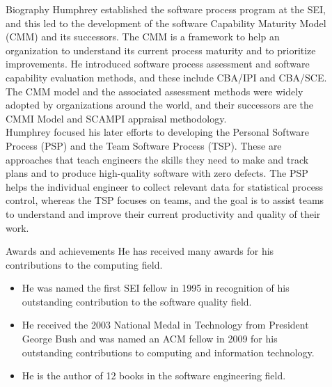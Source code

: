 \documentclass[final]{beamer}
\newlength{\sepwidth}
\newlength{\colwidth}
\newcommand{\separatorcolumn}{\begin{column}{\sepwidth}\end{column}}
\begin{document}
\begin{frame}[t]
\begin{columns}[t]
\begin{column}{\colwidth}
\begin{block}{Biography}
  	Humphrey established the software process program at the SEI, and this led to the development of the software Capability Maturity Model (CMM) and its successors. The CMM is a framework to help an organization to understand its current process maturity and to prioritize improvements. He introduced software process assessment and software capability evaluation methods, and these include CBA/IPI and CBA/SCE. The CMM model and the associated assessment methods were widely adopted by organizations around the world, and their successors are the CMMI Model and SCAMPI appraisal methodology.\\
  	Humphrey focused his later efforts to developing the Personal Software Process (PSP) and the Team Software Process (TSP). These are approaches that teach engineers the skills they need to make and track plans and to produce high-quality software with zero defects. The PSP helps the individual engineer to collect relevant data for statistical process control, whereas the TSP focuses on teams, and the goal is to assist teams to understand and improve their current productivity and quality of their work.
  \end{block}
  \begin{alertblock}{Awards and achievements}
	He has received many awards for his contributions to the computing ﬁeld.
	\begin{itemize}
	\item He was named the ﬁrst SEI fellow in 1995 in recognition of his outstanding contribution to the software quality ﬁeld.
	\item He received the 2003 National Medal in Technology from President George Bush and was named an ACM fellow in 2009 for his outstanding contributions to computing and information technology.
	\item He is the author of 12 books in the software engineering ﬁeld.
	\end{itemize}
  \end{alertblock}
\end{column}
\separatorcolumn
\begin{column}{\colwidth}


\end{column}
\end{columns}
\end{frame}
\end{document}
